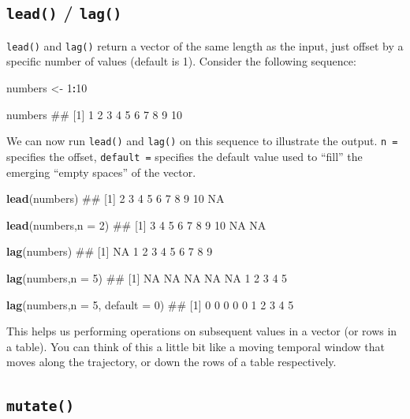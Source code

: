 \documentclass[]{book}
\newenvironment{Shaded}{\begin{snugshade}}{\end{snugshade}}
\newcommand{\KeywordTok}[1]{\textcolor[rgb]{0.13,0.29,0.53}{\textbf{#1}}}
\newcommand{\DataTypeTok}[1]{\textcolor[rgb]{0.13,0.29,0.53}{#1}}
\newcommand{\DecValTok}[1]{\textcolor[rgb]{0.00,0.00,0.81}{#1}}
\newcommand{\StringTok}[1]{\textcolor[rgb]{0.31,0.60,0.02}{#1}}
\newcommand{\OperatorTok}[1]{\textcolor[rgb]{0.81,0.36,0.00}{\textbf{#1}}}
\newcommand{\NormalTok}[1]{#1}
\begin{document}
\subsection{\texorpdfstring{\texttt{lead()} /
\texttt{lag()}}{lead() / lag()}}\label{lead-lag}

\texttt{lead()} and \texttt{lag()} return a vector of the same length as
the input, just offset by a specific number of values (default is 1).
Consider the following sequence:

\begin{Shaded}
\begin{Highlighting}[]
\NormalTok{numbers <-}\StringTok{ }\DecValTok{1}\OperatorTok{:}\DecValTok{10}

\NormalTok{numbers}
\NormalTok{##  [1]  1  2  3  4  5  6  7  8  9 10}
\end{Highlighting}
\end{Shaded}

We can now run \texttt{lead()} and \texttt{lag()} on this sequence to
illustrate the output. \texttt{n\ =} specifies the offset,
\texttt{default\ =} specifies the default value used to ``fill'' the
emerging ``empty spaces'' of the vector.

\begin{Shaded}
\begin{Highlighting}[]
\KeywordTok{lead}\NormalTok{(numbers)}
\NormalTok{##  [1]  2  3  4  5  6  7  8  9 10 NA}

\KeywordTok{lead}\NormalTok{(numbers,}\DataTypeTok{n =} \DecValTok{2}\NormalTok{)}
\NormalTok{##  [1]  3  4  5  6  7  8  9 10 NA NA}

\KeywordTok{lag}\NormalTok{(numbers)}
\NormalTok{##  [1] NA  1  2  3  4  5  6  7  8  9}

\KeywordTok{lag}\NormalTok{(numbers,}\DataTypeTok{n =} \DecValTok{5}\NormalTok{)}
\NormalTok{##  [1] NA NA NA NA NA  1  2  3  4  5}

\KeywordTok{lag}\NormalTok{(numbers,}\DataTypeTok{n =} \DecValTok{5}\NormalTok{, }\DataTypeTok{default =} \DecValTok{0}\NormalTok{)}
\NormalTok{##  [1] 0 0 0 0 0 1 2 3 4 5}
\end{Highlighting}
\end{Shaded}

This helps us performing operations on subsequent values in a vector (or
rows in a table). You can think of this a little bit like a moving
temporal window that moves along the trajectory, or down the rows of a
table respectively.

\subsection{\texorpdfstring{\texttt{mutate()}}{mutate()}}\label{mutate}
\end{document}
